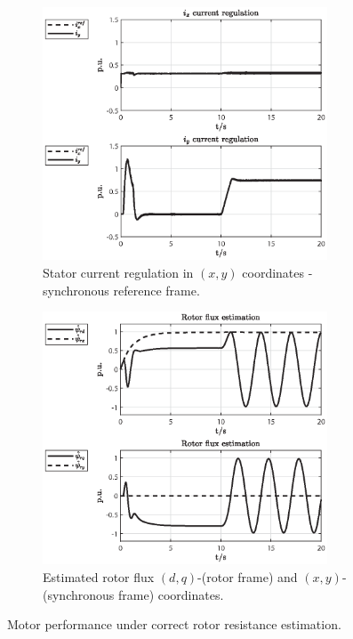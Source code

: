 \documentclass[11pt,a4paper,oneside]{book}
\numberwithin{equation}{section}
\theoremstyle{it}
\theoremstyle{definition}
\begin{document}
\begin{figure}[H]
	\centering
	\begin{subfigure}{0.5\textwidth}
	\centering
	\includegraphics[width = 240pt, keepaspectratio]{figures/equal/current_reg.eps}
	\captionsetup{width=0.65\textwidth, font=footnotesize}	
	\caption{Stator current regulation in $(x,y)$ coordinates - synchronous reference frame.}
	\label{fig_sim_res_1}
	\end{subfigure}%
	\begin{subfigure}{0.5\textwidth}
	\centering
	\includegraphics[width = 240pt, keepaspectratio]{figures/equal/rotor_flux_est_1.eps}
	\captionsetup{width=0.65\textwidth, font=footnotesize}	
	\caption{Estimated rotor flux $(d,q)$-(rotor frame) and $(x,y)$-(synchronous frame) coordinates.}
	\label{fig_sim_res_2}
	\end{subfigure}		
	\captionsetup{width=0.5\textwidth, font=small}		
	\caption{Motor performance under correct rotor resistance estimation.}
	\label{}
\end{figure}
\end{document}
